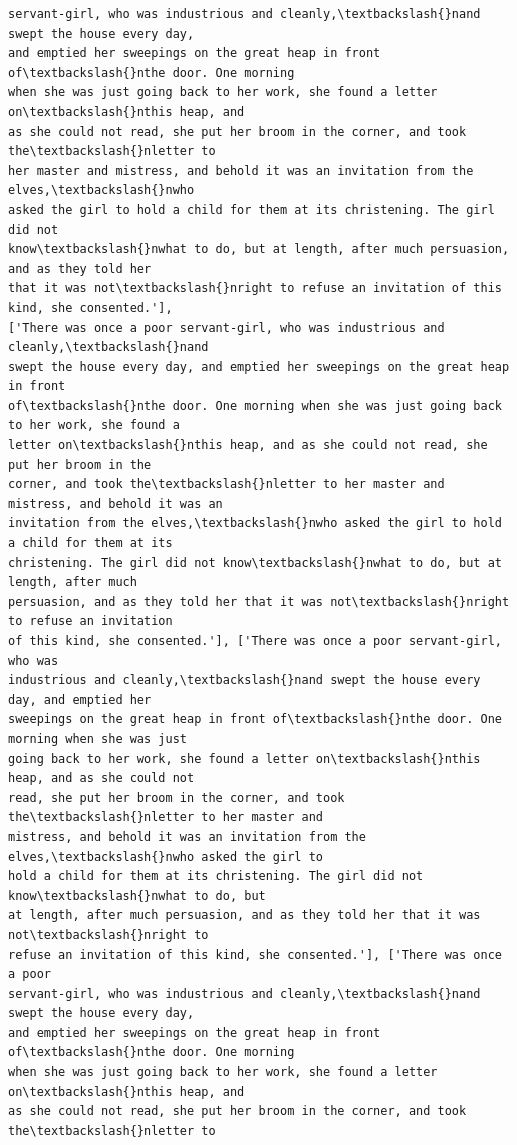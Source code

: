 \documentclass[11pt]{article}
\begin{document}
\begin{Verbatim}[commandchars=\\\{\}]
servant-girl, who was industrious and cleanly,\textbackslash{}nand swept the house every day,
and emptied her sweepings on the great heap in front of\textbackslash{}nthe door. One morning
when she was just going back to her work, she found a letter on\textbackslash{}nthis heap, and
as she could not read, she put her broom in the corner, and took the\textbackslash{}nletter to
her master and mistress, and behold it was an invitation from the elves,\textbackslash{}nwho
asked the girl to hold a child for them at its christening. The girl did not
know\textbackslash{}nwhat to do, but at length, after much persuasion, and as they told her
that it was not\textbackslash{}nright to refuse an invitation of this kind, she consented.'],
['There was once a poor servant-girl, who was industrious and cleanly,\textbackslash{}nand
swept the house every day, and emptied her sweepings on the great heap in front
of\textbackslash{}nthe door. One morning when she was just going back to her work, she found a
letter on\textbackslash{}nthis heap, and as she could not read, she put her broom in the
corner, and took the\textbackslash{}nletter to her master and mistress, and behold it was an
invitation from the elves,\textbackslash{}nwho asked the girl to hold a child for them at its
christening. The girl did not know\textbackslash{}nwhat to do, but at length, after much
persuasion, and as they told her that it was not\textbackslash{}nright to refuse an invitation
of this kind, she consented.'], ['There was once a poor servant-girl, who was
industrious and cleanly,\textbackslash{}nand swept the house every day, and emptied her
sweepings on the great heap in front of\textbackslash{}nthe door. One morning when she was just
going back to her work, she found a letter on\textbackslash{}nthis heap, and as she could not
read, she put her broom in the corner, and took the\textbackslash{}nletter to her master and
mistress, and behold it was an invitation from the elves,\textbackslash{}nwho asked the girl to
hold a child for them at its christening. The girl did not know\textbackslash{}nwhat to do, but
at length, after much persuasion, and as they told her that it was not\textbackslash{}nright to
refuse an invitation of this kind, she consented.'], ['There was once a poor
servant-girl, who was industrious and cleanly,\textbackslash{}nand swept the house every day,
and emptied her sweepings on the great heap in front of\textbackslash{}nthe door. One morning
when she was just going back to her work, she found a letter on\textbackslash{}nthis heap, and
as she could not read, she put her broom in the corner, and took the\textbackslash{}nletter to

\end{Verbatim}
\end{document}
